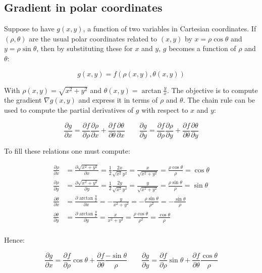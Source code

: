 	\subsection{Gradient in polar coordinates}
	Suppose to have $g(x, y)$, a function of two variables in Cartesian coordinates.
	If $(\rho, \theta)$ are the usual polar coordinates related to $(x, y)$ by $x = \rho\cos\theta$ and $y =\rho\sin\theta$, then by substituting these for $x$ and $y$, $g$ becomes a function of $\rho$ and $\theta$:

	$$g(x, y) = f(\rho(x, y), \theta(x, y))$$

	With $\rho(x,y) =\sqrt{x^2+y^2}$ and $\theta(x, y) = \arctan\frac{y}{x}$.
	The objective is to compute the gradient $\nabla g(x,y)$ and express it in terms of $\rho$ and $\theta$.
	The chain rule can be used to compute the partial derivatives of $g$ with respect to $x$ and $y$:

	$$\frac{\partial g}{\partial x} = \frac{\partial f}{\partial \rho}\frac{\partial \rho}{\partial x} + \frac{\partial f}{\partial \theta}\frac{\partial \theta}{\partial x}\qquad\frac{\partial g}{\partial y} = \frac{\partial f}{\partial \rho}\frac{\partial \rho}{\partial y} + \frac{\partial f}{\partial \theta}\frac{\partial \theta}{\partial y}$$

	To fill these relations one must compute:

	\begin{align*}
		\frac{\partial\rho}{\partial x} &= \frac{\partial\sqrt{x^2+y^2}}{\partial x} = \frac{1}{2}\frac{2x}{\sqrt{x^2}{y^2}} = \frac{x}{\sqrt{x^2+y^2}} = \frac{\rho\cos\theta}{\rho} = \cos\theta\\
		\frac{\partial\rho}{\partial y} &= \frac{\partial\sqrt{x^2+y^2}}{\partial y} = \frac{1}{2}\frac{2y}{\sqrt{x^2}{y^2}} = \frac{y}{\sqrt{x^2+y^2}} = \frac{\rho\sin\theta}{\rho} = \sin\theta\\
		\frac{\partial\theta}{\partial x} &= \frac{\partial\arctan\frac{y}{x}}{\partial x} = -\frac{y}{x^2+y^2} = -\frac{\rho\sin\theta}{\rho^2} = -\frac{\sin\theta}{\rho}\\
		\frac{\partial\theta}{\partial y} &= \frac{\partial\arctan\frac{y}{x}}{\partial y} = \frac{x}{x^2+y^2} = \frac{\rho\cos\theta}{\rho^2} = \frac{\cos\theta}{\rho}\\
	\end{align*}

	Hence:

	$$\frac{\partial g}{\partial x} = \frac{\partial f}{\partial\rho}\cos\theta + \frac{\partial f}{\partial\theta}\frac{-\sin\theta}{\rho}\qquad \frac{\partial g}{\partial y} = \frac{\partial f}{\partial \rho}\sin\theta + \frac{\partial f}{\partial \theta}\frac{\cos\theta}{\rho}$$

